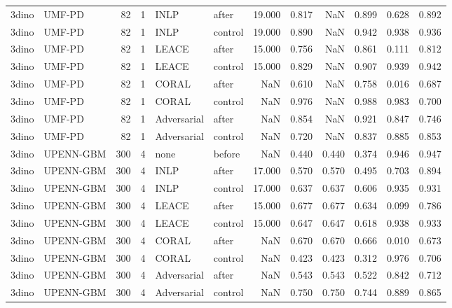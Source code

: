 \begin{tabular}{llrrllrrrrrr}
3dino & UMF-PD & 82 & 1 & INLP & after & 19.000 & 0.817 & NaN & 0.899 & 0.628 & 0.892 \\
3dino & UMF-PD & 82 & 1 & INLP & control & 19.000 & 0.890 & NaN & 0.942 & 0.938 & 0.936 \\
3dino & UMF-PD & 82 & 1 & LEACE & after & 15.000 & 0.756 & NaN & 0.861 & 0.111 & 0.812 \\
3dino & UMF-PD & 82 & 1 & LEACE & control & 15.000 & 0.829 & NaN & 0.907 & 0.939 & 0.942 \\
3dino & UMF-PD & 82 & 1 & CORAL & after & NaN & 0.610 & NaN & 0.758 & 0.016 & 0.687 \\
3dino & UMF-PD & 82 & 1 & CORAL & control & NaN & 0.976 & NaN & 0.988 & 0.983 & 0.700 \\
3dino & UMF-PD & 82 & 1 & Adversarial & after & NaN & 0.854 & NaN & 0.921 & 0.847 & 0.746 \\
3dino & UMF-PD & 82 & 1 & Adversarial & control & NaN & 0.720 & NaN & 0.837 & 0.885 & 0.853 \\
3dino & UPENN-GBM & 300 & 4 & none & before & NaN & 0.440 & 0.440 & 0.374 & 0.946 & 0.947 \\
3dino & UPENN-GBM & 300 & 4 & INLP & after & 17.000 & 0.570 & 0.570 & 0.495 & 0.703 & 0.894 \\
3dino & UPENN-GBM & 300 & 4 & INLP & control & 17.000 & 0.637 & 0.637 & 0.606 & 0.935 & 0.931 \\
3dino & UPENN-GBM & 300 & 4 & LEACE & after & 15.000 & 0.677 & 0.677 & 0.634 & 0.099 & 0.786 \\
3dino & UPENN-GBM & 300 & 4 & LEACE & control & 15.000 & 0.647 & 0.647 & 0.618 & 0.938 & 0.933 \\
3dino & UPENN-GBM & 300 & 4 & CORAL & after & NaN & 0.670 & 0.670 & 0.666 & 0.010 & 0.673 \\
3dino & UPENN-GBM & 300 & 4 & CORAL & control & NaN & 0.423 & 0.423 & 0.312 & 0.976 & 0.706 \\
3dino & UPENN-GBM & 300 & 4 & Adversarial & after & NaN & 0.543 & 0.543 & 0.522 & 0.842 & 0.712 \\
3dino & UPENN-GBM & 300 & 4 & Adversarial & control & NaN & 0.750 & 0.750 & 0.744 & 0.889 & 0.865 \\
\bottomrule
\end{tabular}

